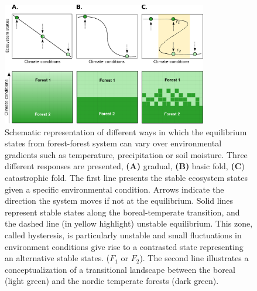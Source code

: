 \begin{figure}[t]
	\begin{center}
	\includegraphics[width=0.8\textwidth]{fig/states.pdf}
	\end{center}
	\caption{Schematic representation of different ways in which the equilibrium
	states from forest-forest system can vary over environmental gradients such as temperature, precipitation
	or soil moisture. Three different responses are presented,
	\textbf{(A)} gradual, \textbf{(B)} basic fold, \textbf{(C}) catastrophic fold.
	The first line presents the stable ecosystem states 
	given a specific environmental condition. Arrows indicate the
	direction the system moves if not at the equilibrium. 
	Solid lines represent stable states along the boreal-temperate
	transition, and the dashed line (in yellow highlight) unstable equilibrium. This zone,
	called hysteresis, is particularly unstable and small fluctuations in
	environment conditions give rise to a contrasted state representing an
	alternative stable states. ($F_1$ or $F_2$). 
	The second line illustrates a conceptualization of a transitional landscape
	between the boreal (light green) and the nordic temperate forests (dark
	green).}
	\label{fig1}
	\vspace{-1.25em}
\end{figure}


